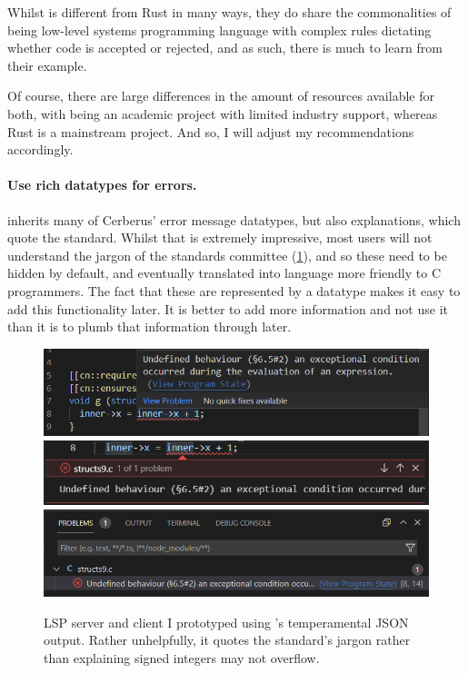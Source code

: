 Whilst  is different from Rust in many ways, they do share the
commonalities of being low-level systems programming language with complex
rules dictating whether code is accepted or rejected, and as such, there is
much to learn from their example.

Of course, there are large differences in the amount of resources available for
both, with  being an academic project with limited industry support,
whereas Rust is a mainstream project. And so, I will adjust my recommendations
accordingly.

\paragraph{Use rich datatypes for errors.}  inherits many of Cerberus'
error message datatypes, but also explanations, which quote the standard.
Whilst that is extremely impressive, most users will not understand the jargon
of the standards committee (\cref{fig:lsp-extra}), and so these need to be
hidden by default, and eventually translated into language more friendly to C
programmers. The fact that these are represented by a datatype makes it easy to
add this functionality later. It is better to add more information and not use
it than it is to plumb that information through later.

\begin{figure}[htp]
    \includegraphics{figures/lsp-structs9-hover.png}
    \includegraphics{figures/lsp-structs9-inline.png}
    \includegraphics{figures/lsp-structs9-problems.png}
    \caption{LSP server and client I prototyped using 's temperamental
    JSON output. Rather unhelpfully, it quotes the  standard's jargon
    rather than explaining signed integers may not overflow.}\label{fig:lsp-extra}
\end{figure}

